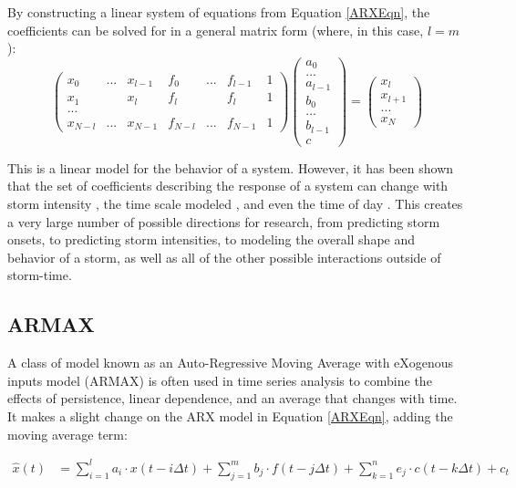 By constructing a linear system of equations from Equation \ref{ARXEqn}, the coefficients can be solved for in a general matrix form (where, in this case, $l=m$):
\[
\left( \begin{array}{ccccccc}
x_0 & ... & x_{l-1} & f_0 & ... & f_{l-1} & 1\\
x_1 &     & x_l & f_l &  &f_l & 1\\
... &     &     &     &  &   & \\
x_{N-l} & ... & x_{N-1} & f_{N-l} & ... & f_{N-1} & 1
\end{array} \right)
\left(\begin{array}{c}
a_0\\...\\a_{l-1}\\b_0\\...\\b_{l-1}\\c
\end{array}\right)
=
\left(
\begin{array}{c}
x_l \\ x_{l+1} \\ ... \\ x_{N}
\end{array}
\right)
\]

This is a linear model for the behavior of a system. However, it has been shown that the set of coefficients describing the response of a system can change with storm intensity \cite{ARXEqn}, the time scale modeled \cite{Coupling}, and even the time of day \cite{VBzAL}. This creates a very large number of possible directions for research, from predicting storm onsets, to predicting storm intensities, to modeling the overall shape and behavior of a storm, as well as all of the other possible interactions outside of storm-time. 


\subsection{ARMAX}

A class of model known as an Auto-Regressive Moving Average with eXogenous inputs model (ARMAX) is often used in time series analysis to combine the effects of persistence, linear dependence, and an average that changes with time. It makes a slight change on the ARX model in Equation \ref{ARXEqn}, adding the moving average term:

\begin{align}
\hat{x}(t)&=\sum_{i=1}^la_i\cdot x(t-i\Delta t)+\sum_{j=1}^m b_j\cdot f(t-j\Delta t)+\sum_{k=1}^n e_j\cdot c(t-k\Delta t)+c_t
\label{ARMAXEqn}
\end{align}


